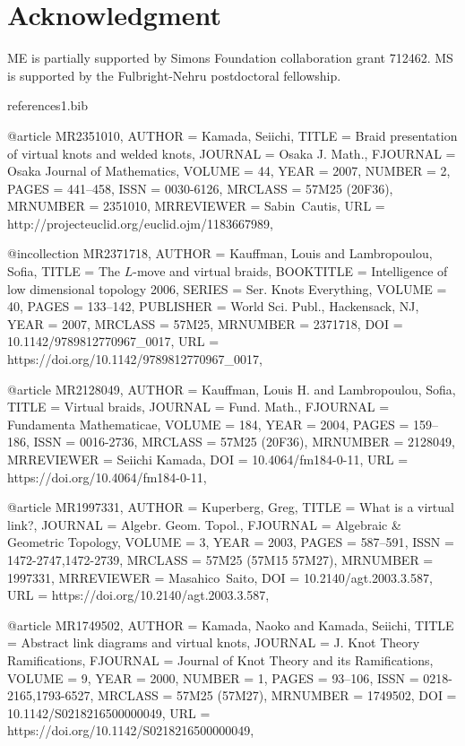 \documentclass[11pt, reqno]{amsart}
\theoremstyle{definition}
\begin{document}
\section*{Acknowledgment}
ME is partially supported by Simons Foundation collaboration grant 712462.  MS is supported by the Fulbright-Nehru postdoctoral fellowship.


\begin{filecontents*}[overwrite]{references1.bib}


@article {MR2351010,
    AUTHOR = {Kamada, Seiichi},
     TITLE = {Braid presentation of virtual knots and welded knots},
   JOURNAL = {Osaka J. Math.},
  FJOURNAL = {Osaka Journal of Mathematics},
    VOLUME = {44},
      YEAR = {2007},
    NUMBER = {2},
     PAGES = {441--458},
      ISSN = {0030-6126},
   MRCLASS = {57M25 (20F36)},
  MRNUMBER = {2351010},
MRREVIEWER = {Sabin\ Cautis},
       URL = {http://projecteuclid.org/euclid.ojm/1183667989},
}

@incollection {MR2371718,
    AUTHOR = {Kauffman, Louis and Lambropoulou, Sofia},
     TITLE = {The {$L$}-move and virtual braids},
 BOOKTITLE = {Intelligence of low dimensional topology 2006},
    SERIES = {Ser. Knots Everything},
    VOLUME = {40},
     PAGES = {133--142},
 PUBLISHER = {World Sci. Publ., Hackensack, NJ},
      YEAR = {2007},
   MRCLASS = {57M25},
  MRNUMBER = {2371718},
       DOI = {10.1142/9789812770967\_0017},
       URL = {https://doi.org/10.1142/9789812770967_0017},
}

@article {MR2128049,
    AUTHOR = {Kauffman, Louis H. and Lambropoulou, Sofia},
     TITLE = {Virtual braids},
   JOURNAL = {Fund. Math.},
  FJOURNAL = {Fundamenta Mathematicae},
    VOLUME = {184},
      YEAR = {2004},
     PAGES = {159--186},
      ISSN = {0016-2736},
   MRCLASS = {57M25 (20F36)},
  MRNUMBER = {2128049},
MRREVIEWER = {Seiichi Kamada},
       DOI = {10.4064/fm184-0-11},
       URL = {https://doi.org/10.4064/fm184-0-11},
}


@article {MR1997331,
    AUTHOR = {Kuperberg, Greg},
     TITLE = {What is a virtual link?},
   JOURNAL = {Algebr. Geom. Topol.},
  FJOURNAL = {Algebraic \& Geometric Topology},
    VOLUME = {3},
      YEAR = {2003},
     PAGES = {587--591},
      ISSN = {1472-2747,1472-2739},
   MRCLASS = {57M25 (57M15 57M27)},
  MRNUMBER = {1997331},
MRREVIEWER = {Masahico\ Saito},
       DOI = {10.2140/agt.2003.3.587},
       URL = {https://doi.org/10.2140/agt.2003.3.587},
}

@article {MR1749502,
    AUTHOR = {Kamada, Naoko and Kamada, Seiichi},
     TITLE = {Abstract link diagrams and virtual knots},
   JOURNAL = {J. Knot Theory Ramifications},
  FJOURNAL = {Journal of Knot Theory and its Ramifications},
    VOLUME = {9},
      YEAR = {2000},
    NUMBER = {1},
     PAGES = {93--106},
      ISSN = {0218-2165,1793-6527},
   MRCLASS = {57M25 (57M27)},
  MRNUMBER = {1749502},
       DOI = {10.1142/S0218216500000049},
       URL = {https://doi.org/10.1142/S0218216500000049},
}


\end{filecontents*}
\end{document}
